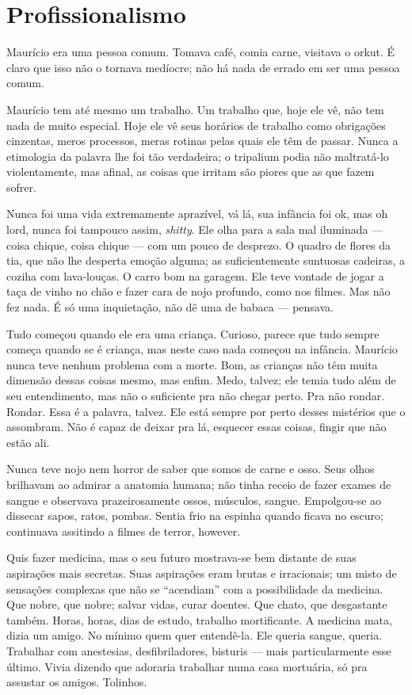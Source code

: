 \chapter{Profissionalismo}

Maurício era uma pessoa comum. Tomava café, comia carne, visitava o orkut. É claro que isso não o tornava medíocre; não há nada de errado em ser uma pessoa comum.

Maurício tem até mesmo um trabalho. Um trabalho que, hoje ele vê, não tem nada de muito especial. Hoje ele vê seus horários de trabalho como obrigações cinzentas, meros processos, meras rotinas pelas quais ele têm de passar. Nunca a etimologia da palavra lhe foi tão verdadeira; o tripalium podia não maltratá-lo violentamente, mas afinal, as coisas que irritam são piores que as que fazem sofrer.

Nunca foi uma vida extremamente aprazível, vá lá, sua infância foi ok, mas oh lord, nunca foi tampouco assim, \emph{shitty}. Ele olha para a sala mal iluminada --- coisa chique, coisa chique --- com um pouco de desprezo. O quadro de flores da tia, que não lhe desperta emoção alguma; as suficientemente suntuosas cadeiras, a coziha com lava-louças. O carro bom na garagem. Ele teve vontade de jogar a taça de vinho no chão e fazer cara de nojo profundo, como nos filmes. Mas não fez nada. É só uma inquietação, não dê uma de babaca --- pensava.

Tudo começou quando ele era uma criança. Curioso, parece que tudo sempre começa quando se é criança, mas neste caso nada começou na infância. Maurício nunca teve nenhum problema com a morte. Bom, as crianças não têm muita dimensão dessas coisas mesmo, mas enfim. Medo, talvez; ele temia tudo além de seu entendimento, mas não o suficiente pra não chegar perto. Pra não rondar. Rondar. Essa é a palavra, talvez. Ele está sempre por perto desses mistérios que o assombram. Não é capaz de deixar pra lá, esquecer essas coisas, fingir que não estão ali.

Nunca teve nojo nem horror de saber que somos de carne e osso. Seus olhos brilhavam ao admirar a anatomia humana; não tinha receio de fazer exames de sangue e observava prazeirosamente ossos, músculos, sangue. Empolgou-se ao dissecar sapos, ratos, pombas. Sentia frio na espinha quando ficava no escuro; continuava assitindo a filmes de terror, however.

Quis fazer medicina, mas o seu futuro mostrava-se bem distante de suas aspirações mais secretas. Suas aspirações eram brutas e irracionais; um misto de sensações complexas que não se ``acendiam'' com a possibilidade da medicina. Que nobre, que nobre; salvar vidas, curar doentes. Que chato, que desgastante também. Horas, horas, dias de estudo, trabalho mortificante. A medicina mata, dizia um amigo. No mínimo quem quer entendê-la. Ele queria sangue, queria. Trabalhar com anestesias, desfibriladores, bisturis --- mais particularmente esse último. Vivia dizendo que adoraria trabalhar numa casa mortuária, só pra assustar os amigos. Tolinhos.

